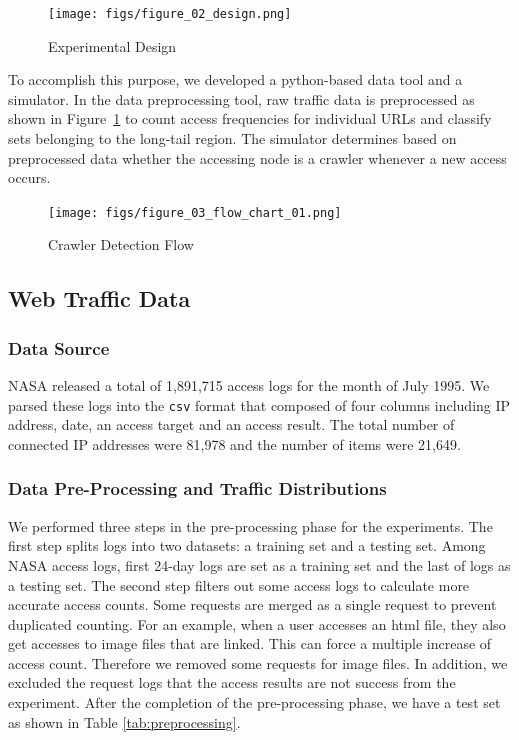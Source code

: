 \documentclass[sigconf,review]{acmart}
\begin{document}
\begin{figure}[H]
    \centering
    \texttt{[image: figs/figure\_02\_design.png]}
    \caption{Experimental Design}
    \label{fig:fig2}
\end{figure}


To accomplish this purpose, we developed a python-based data tool and a simulator. In the data preprocessing tool, raw traffic data is preprocessed as shown in Figure~\ref{fig:fig2} to count access frequencies for individual URLs and classify sets belonging to the long-tail region. The simulator determines based on preprocessed data whether the accessing node is a crawler whenever a new access occurs.

\begin{figure} [H]
    \texttt{[image: figs/figure\_03\_flow\_chart\_01.png]}
    \caption{Crawler Detection Flow}
    \label{fig:fig6}
\end{figure}

\subsection{Web Traffic Data}

\subsubsection{Data Source} 

NASA released a total of 1,891,715 access logs for the month of July 1995. We parsed these logs into the \texttt{csv} format that composed of four columns including IP address, date, an access target and an access result. The total number of connected IP addresses were 81,978 and the number of items were 21,649.


\subsubsection{Data Pre-Processing and Traffic Distributions}

We performed three steps in the pre-processing phase for the experiments. The first step splits logs into two datasets: a training set and a testing set. Among NASA access logs, first 24-day logs are set as a training set and the last of logs as a testing set. The second step filters out some access logs to calculate more accurate access counts. Some requests are merged as a single request to prevent duplicated counting. For an example, when a user accesses an html file, they also get accesses to image files that are linked. This can force a multiple increase of access count. Therefore we removed some requests for image files. In addition, we excluded the request logs that the access results are not success from the experiment. After the completion of the pre-processing phase, we have a test set as shown in Table \ref{tab:preprocessing}.
\end{document}
